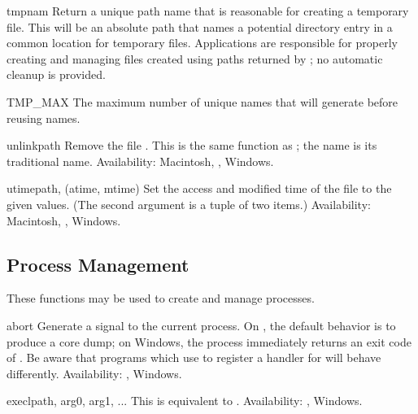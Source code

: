 \begin{funcdesc}{tmpnam}{}
Return a unique path name that is reasonable for creating a temporary
file.  This will be an absolute path that names a potential directory
entry in a common location for temporary files.  Applications are
responsible for properly creating and managing files created using
paths returned by ; no automatic cleanup is
provided.
\end{funcdesc}

\begin{datadesc}{TMP_MAX}
The maximum number of unique names that  will
generate before reusing names.
\end{datadesc}

\begin{funcdesc}{unlink}{path}
Remove the file .  This is the same function as
; the  name is its traditional
\UNIX{} name.
Availability: Macintosh, \UNIX{}, Windows.
\end{funcdesc}

\begin{funcdesc}{utime}{path, (atime, mtime)}
Set the access and modified time of the file to the given values.
(The second argument is a tuple of two items.)
Availability: Macintosh, \UNIX{}, Windows.
\end{funcdesc}


\subsection{Process Management \label{os-process}}

These functions may be used to create and manage processes.


\begin{funcdesc}{abort}{}
Generate a  signal to the current process.  On
\UNIX, the default behavior is to produce a core dump; on Windows, the 
process immediately returns an exit code of .  Be aware that
programs which use  to register a handler
for  will behave differently.
Availability: \UNIX, Windows.
\end{funcdesc}

\begin{funcdesc}{execl}{path, arg0, arg1, ...}
This is equivalent to
.
Availability: \UNIX{}, Windows.
\end{funcdesc}

